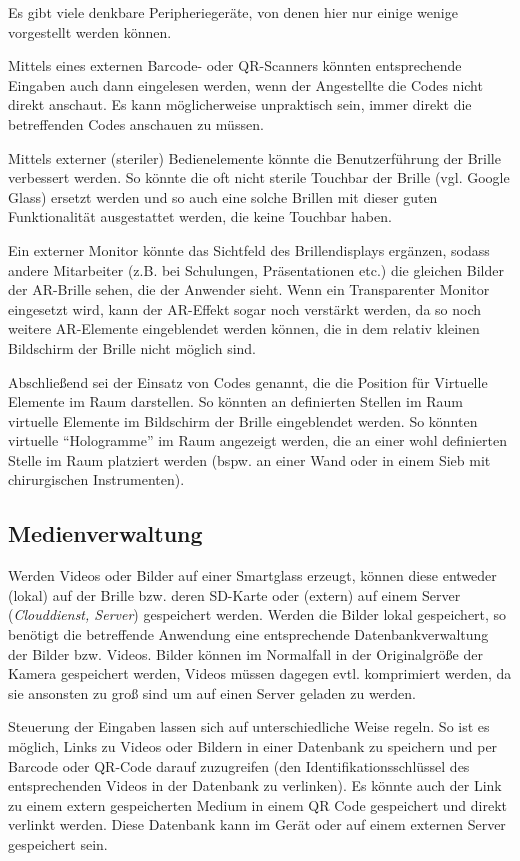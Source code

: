 Es gibt viele denkbare Peripheriegeräte, von denen hier nur einige wenige vorgestellt werden können.

Mittels eines externen Barcode- oder QR-Scanners könnten entsprechende Eingaben auch dann eingelesen werden, wenn der Angestellte die Codes nicht direkt anschaut. Es kann möglicherweise unpraktisch sein, immer direkt die betreffenden Codes anschauen zu müssen. 

Mittels externer (steriler) Bedienelemente könnte die Benutzerführung der Brille verbessert werden. So könnte die oft nicht sterile Touchbar der Brille (vgl. Google Glass) ersetzt werden und so auch eine solche Brillen mit dieser guten Funktionalität ausgestattet werden, die keine Touchbar haben. 

Ein externer Monitor könnte das Sichtfeld des Brillendisplays ergänzen, sodass andere Mitarbeiter (z.B. bei Schulungen, Präsentationen etc.) die gleichen Bilder der AR-Brille sehen, die der Anwender sieht. Wenn ein Transparenter Monitor eingesetzt wird, kann der AR-Effekt sogar noch verstärkt werden, da so noch weitere AR-Elemente eingeblendet werden können, die in dem relativ kleinen Bildschirm der Brille nicht möglich sind.

Abschließend sei der Einsatz von Codes genannt, die die Position für Virtuelle Elemente im Raum darstellen. So könnten an definierten Stellen im Raum virtuelle Elemente im Bildschirm der Brille eingeblendet werden. So könnten virtuelle \enquote{Hologramme} im Raum angezeigt werden, die an einer wohl definierten Stelle im Raum platziert werden (bspw. an einer Wand oder in einem Sieb mit chirurgischen Instrumenten).
%
%
%
%
%
%
\subsection{Medienverwaltung}
\label{sec:Medienverwaltung}
Werden Videos oder Bilder auf einer Smartglass erzeugt, können diese entweder (lokal) auf der Brille bzw. deren SD-Karte oder (extern) auf einem Server (\emph{Clouddienst, Server}) gespeichert werden. Werden die Bilder lokal gespeichert, so benötigt die betreffende Anwendung eine entsprechende Datenbankverwaltung der Bilder bzw. Videos. Bilder können im Normalfall in der Originalgröße der Kamera gespeichert werden, Videos müssen dagegen evtl. komprimiert werden, da sie ansonsten zu groß sind um auf einen Server geladen zu werden. 

Steuerung der Eingaben lassen sich auf unterschiedliche Weise regeln. So ist es möglich, Links zu Videos oder Bildern in einer Datenbank zu speichern und per Barcode oder QR-Code darauf zuzugreifen (den Identifikationsschlüssel des entsprechenden Videos in der Datenbank zu verlinken). Es könnte auch der Link zu einem extern gespeicherten Medium in einem QR Code gespeichert und direkt verlinkt werden. Diese Datenbank kann im Gerät oder auf einem externen Server gespeichert sein. 

